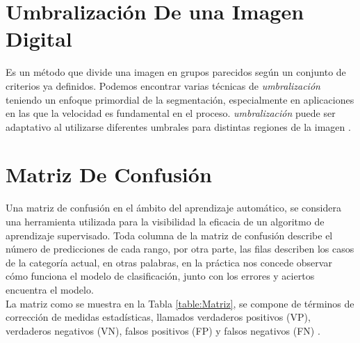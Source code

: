 \section{Umbralización De una Imagen Digital}


Es un método que divide una imagen en grupos parecidos según un conjunto de criterios ya definidos. Podemos encontrar varias técnicas de \textit{umbralización} teniendo un enfoque primordial de la segmentación, especialmente en aplicaciones en las que la velocidad es fundamental en el proceso. \textit{umbralización} puede ser adaptativo al utilizarse diferentes umbrales para distintas regiones de la imagen \cite{kulkarni2012color}.

\section{Matriz De Confusión}

Una matriz de confusión en el ámbito del aprendizaje automático, se considera una herramienta utilizada para la visibilidad la eficacia de un algoritmo de aprendizaje supervisado. Toda columna de la matriz de confusión describe el número de predicciones de cada rango, por otra parte, las filas describen los casos de la categoría actual, en otras palabras, en la práctica nos concede observar cómo funciona el modelo de clasificación, junto con los errores y aciertos encuentra el modelo.\\

La matriz como se muestra en la Tabla \ref{table:Matriz}, se compone de términos de corrección de medidas estadísticas, llamados verdaderos positivos (VP), verdaderos negativos (VN), falsos positivos (FP) y falsos negativos (FN) \cite{maria2016performance}. 

